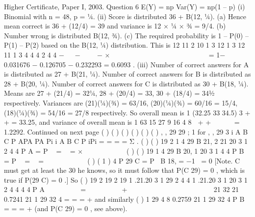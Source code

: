 \documentclass[a4paper,12pt]{article}
\begin{document}
Higher Certificate, Paper I, 2003. Question 6
E(Y) = np Var(Y) = np(1 – p)
(i) Binomial with n = 48, p = ¼.
(ii) Score is distributed 36 + B(12, ¼).
(a) Hence mean correct is 36 + (12/4) = 39 and variance is 12 × ¼ × ¾ = 9/4.
(b) Number wrong is distributed B(12, ¾).
(c) The required probability is 1 – P(0) – P(1) – P(2) based on the B(12, ¼)
distribution. This is
12 11 2 10 1 3 12 1 3 12 11 1 3
4 4 4 2 4 4
−   −    − ×             
        
= 1− 0.031676 − 0.126705 − 0.232293 = 0.6093 .
(iii) Number of correct answers for A is distributed as 27 + B(21, ¼).
Number of correct answers for B is distributed as 28 + B(20, ¼).
Number of correct answers for C is distributed as 30 + B(18, ¼).
Means are 27 + (21/4) = 32¼, 28 + (20/4) = 33, 30 + (18/4) = 34½
respectively.
Variances are (21)(¼)(¾) = 63/16, (20)(¼)(¾) = 60/16 = 15/4, (18)(¼)(¾) =
54/16 = 27/8 respectively.
So overall mean is 1 (32.25 33 34.5)
3
+ + = 33.25,
and variance of overall mean is 1 63 15 27
9 16 4 8
 + +   
 
= 1.2292.
Continued on next page
( ) ( ) ( )
( ) ( ) ( )
, ,
29 29 ; 1 for , ,
29 3
i A B C
P APA
PA Pi i A B C
P iPi
=
= = = Σ .
( ) ( )
19 2
1
4
29 B 21, 2 21 20 3 1
2 4 4
P A = P  =  = ×        
( ) ( )
19
1
4
29 B 20, 1 20 3 1
4 4
P B = P  =  =        
( ) ( 1 )
4 P 29 C = P B 18, = −1 = 0
[Note. C must get at least the 30 he knows, so it must follow that
P(C 29) = 0 , which is true if P(29 C) = 0 .]
So ( )
19 2
19 2 19
1 .21.20 3 1
29 2 4 4
1 .21.20 3 1 20 3 1
2 4 4 4 4
P A
   
   
=    
    +            
       
21
32 21 0.7241 21 1 29
32 4
= = =
+
and similarly
( )
1
29 4 8 0.2759 21 1 29
32 4
P B = = =
+
(and P(C 29) = 0 , see above).
\end{document}
